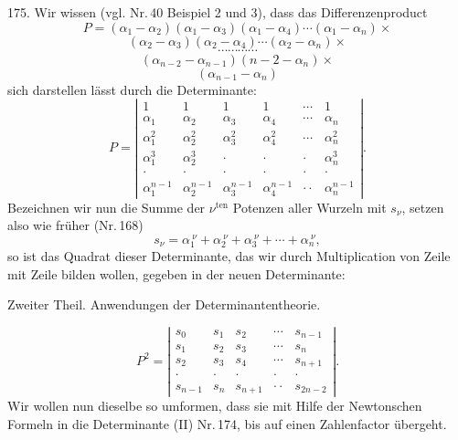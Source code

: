 \documentclass[11pt]{article}
\providecommand{\gesperrt}[1]{\textls[130]{#1}}
\providecommand{\weberpage}[1]{}
\begin{document}
175. \gesperrt{Zweiter Beweis.} Wir wissen (vgl. Nr.\,40 Beispiel 2 und 3), dass das Differenzenproduct
\[
P = (\alpha_1 - \alpha_2)(\alpha_1 - \alpha_3)(\alpha_1 - \alpha_4) \cdots (\alpha_1 - \alpha_n) \times
\]
\[
(\alpha_2 - \alpha_3)(\alpha_2 - \alpha_4) \cdots (\alpha_2 - \alpha_n) \times
\]
\[
\cdots \cdots \cdots \cdots
\]
\[
(\alpha_{n-2} - \alpha_{n-1})(n-2 - \alpha_n) \times %
\]
\[
(\alpha_{n-1} - \alpha_n)
\]
sich darstellen lässt durch die Determinante:
\[
P =
\left|
\begin{array}{cccccc}
1 & 1 & 1 & 1 & \cdots & 1 \\
\alpha_1 & \alpha_2 & \alpha_3 & \alpha_4 & \cdots & \alpha_n \\
\alpha_1^2 & \alpha_2^2 & \alpha_3^2 & \alpha_4^2 & \cdots & \alpha_n^2 \\
\alpha_1^3 & \alpha_2^3 & \cdot & \cdot & \cdot & \alpha_n^3 \\
\cdot & \cdot & \cdot & \cdot & \cdot & \cdot \\
\alpha_1^{n-1} & \alpha_2^{n-1} & \alpha_3^{n-1} & \alpha_4^{n-1} & \cdot\cdot & \alpha_n^{n-1}
\end{array}
\right| .
\]
Bezeichnen wir nun die Summe der $\nu^{\mathrm{ten}}$ Potenzen aller Wurzeln mit $s_\nu$, setzen also wie früher (Nr.\,168)
\[
s_\nu = \alpha_1^{\ \nu} + \alpha_2^{\ \nu} + \alpha_3^{\ \nu} + \cdots + \alpha_n^{\ \nu},
\]
so ist das Quadrat dieser Determinante, das wir durch Multiplication von Zeile mit Zeile bilden wollen, gegeben in der neuen Determinante:


\weberpage{188}

Zweiter Theil. Anwendungen der Determinantentheorie.

\[
P^2 =
\left|
\begin{array}{ccccc}
s_0 & s_1 & s_2 & \cdots & s_{n-1} \\
s_1 & s_2 & s_3 & \cdots & s_n \\
s_2 & s_3 & s_4 & \cdots & s_{n+1} \\
\cdot & \cdot & \cdot & \cdot & \cdot \\
s_{n-1} & s_n & s_{n+1} & \cdot\cdot & s_{2n-2}
\end{array}
\right| .
\]
Wir wollen nun dieselbe so umformen, dass sie mit Hilfe der Newton\-schen Formeln in die Determinante (II) Nr.\,174, bis auf einen Zahlenfactor übergeht.
\end{document}
